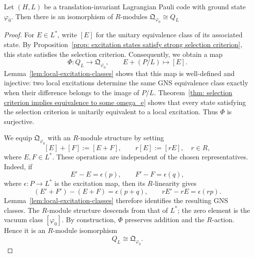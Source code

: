 \documentclass[11pt]{amsart}
\begin{document}
\begin{thm}\label{thm:selection-sector-module}
    Let $(H,L)$ be a translation-invariant Lagrangian Pauli code with ground state $\varphi_0$. Then there is an isomorphism of $R$-modules
    $\mathfrak{Q}_{\varphi_0}\cong Q_L$
    \begin{proof}
        For $E\in L^*$, write $[E]$ for the unitary equivalence class of its associated state. By Proposition~\ref{prop: excitation states satisfy strong selection criterion}, this state satisfies the selection criterion. Consequently, we obtain a map
        \[
        \Phi\colon Q_L\longrightarrow\mathfrak Q_{\varphi_0},
        \qquad E+(P/L)\longmapsto[E].
        \]
        Lemma~\ref{lem:local-excitation-classes} shows that this map is well-defined and injective: two local excitations determine the same GNS equivalence class exactly when their difference belongs to the image of $P/L$. Theorem~\ref{thm: selection criterion implies equivalence to some omega_e} shows that every state satisfying the selection criterion is unitarily equivalent to a local excitation. Thus $\Phi$ is surjective.

        We equip $\mathfrak Q_{\varphi_0}$ with an $R$-module structure by setting
        \[
        [E]+[F]:=[E+F],
        \qquad r[E]:=[rE],\quad r\in R,
        \]
        where $E,F\in L^*$. These operations are independent of the chosen representatives. Indeed, if
        \[
        E'-E=\epsilon(p),\qquad F'-F=\epsilon(q),
        \]
        where $\epsilon\colon P\to L^*$ is the excitation map, then its $R$-linearity gives
        \[
        (E'+F')-(E+F)=\epsilon(p+q),
        \qquad rE'-rE=\epsilon(rp).
        \]
        Lemma~\ref{lem:local-excitation-classes} therefore identifies the resulting GNS classes. The $R$-module structure descends from that of $L^*$; the zero element is the vacuum class $[\varphi_0]$. By construction, $\Phi$ preserves addition and the $R$-action. Hence it is an $R$-module isomorphism
        \[
        Q_L\cong\mathfrak Q_{\varphi_0}.
        \]
    \end{proof}
\end{thm}
\end{document}
